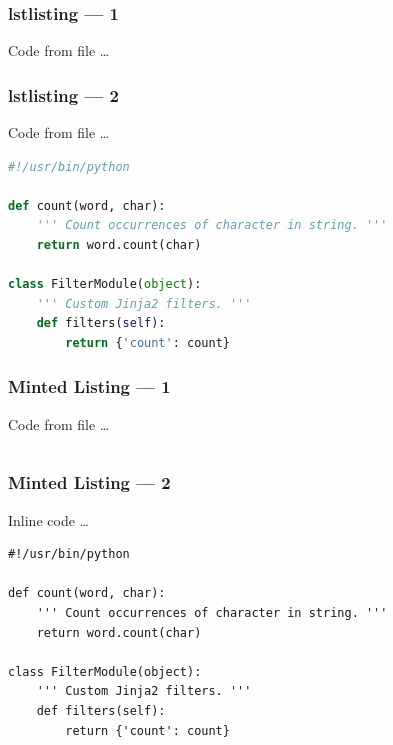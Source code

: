 \documentclass[pdf]{beamer}
\begin{document}
\begin{frame}
  \frametitle{lstlisting --- 1}
  Code from file \ldots
  
\end{frame}

\begin{frame}[fragile]
  \frametitle{lstlisting --- 2}
  Code from file \ldots
  \begin{lstlisting}[language=python]
#!/usr/bin/python

def count(word, char):
    ''' Count occurrences of character in string. '''
    return word.count(char)

class FilterModule(object):
    ''' Custom Jinja2 filters. '''
    def filters(self):
        return {'count': count}
  \end{lstlisting}
\end{frame}

\begin{frame}
  \frametitle{Minted Listing --- 1}
  Code from file \ldots
  \inputminted{python}{example.py}
\end{frame}

\begin{frame}[fragile]
  \frametitle{Minted Listing --- 2}
  Inline code \ldots
  \begin{verbatim}
#!/usr/bin/python

def count(word, char):
    ''' Count occurrences of character in string. '''
    return word.count(char)

class FilterModule(object):
    ''' Custom Jinja2 filters. '''
    def filters(self):
        return {'count': count}
  \end{verbatim}
\end{frame}
\end{document}
